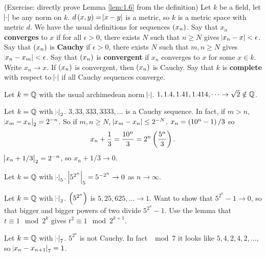 (Exercise: directly prove Lemma \ref{lem:1.6} from the definition) Let $ k $ be a field, let $ \abs{\cdot} $ be any norm on $ k $. $ d\br{x, y} = \abs{x - y} $ is a metric, so $ k $ is a metric space with metric $ d $. We have the usual definitions for sequences $ \br{x_n} $. Say that $ x_n $ \textbf{converges} to $ x $ if for all $ \epsilon > 0 $, there exists $ N $ such that $ n \ge N $ gives $ \abs{x_n - x} < \epsilon $. Say that $ \br{x_n} $ is \textbf{Cauchy} if $ \epsilon > 0 $, there exists $ N $ such that $ m, n \ge N $ gives $ \abs{x_n - x_m} < \epsilon $. Say that $ \br{x_n} $ is \textbf{convergent} if $ x_n $ converges to $ x $ for some $ x \in k $. Write $ x_n \to x $. If $ \br{x_n} $ is convergent, then $ \br{x_n} $ is Cauchy. Say that $ k $ is \textbf{complete} with respect to $ \abs{\cdot} $ if all Cauchy sequences converge.

\pagebreak

\begin{example*}
Let $ k = \mathbb{Q} $ with the usual archimedean norm $ \abs{\cdot} $. $ 1, 1.4, 1.41, 1.414, \dots \to \sqrt{2} \notin \mathbb{Q} $.
\end{example*}

\begin{example*}
Let $ k = \mathbb{Q} $ with $ \abs{\cdot}_2 $. $ 3, 33, 333, 3333, \dots $ is a Cauchy sequence. In fact, if $ m > n $, $ \abs{x_m - x_n}_2 = 2^{-n} $. So if $ m, n \ge N $, $ \abs{x_m - x_n} \le 2^{-N} $. $ x_n = \br{10^n - 1} / 3 $ so
$$ x_n + \dfrac{1}{3} = \dfrac{10^n}{3} = 2^n\br{\dfrac{5^n}{3}}. $$
$ \abs{x_n + 1 / 3}_2 = 2^{-n} $, so $ x_n + 1 / 3 \to 0 $.
\end{example*}

\begin{example*}
Let $ k = \mathbb{Q} $ with $ \abs{\cdot}_5 $. $ \abs{5^{2^n}}_5 = 5^{-2^n} \to 0 $ as $ n \to \infty $.
\end{example*}

\begin{example*}
Let $ k = \mathbb{Q} $ with $ \abs{\cdot}_2 $. $ \br{5^{2^n}} $ is $ 5, 25, 625, \dots \to 1 $. Want to show that $ 5^{2^n} - 1 \to 0 $, so that bigger and bigger powers of two divide $ 5^{2^n} - 1 $. Use the lemma that $ t \equiv 1 \mod 2^k $ gives $ t^2 \equiv 1 \mod 2^{k + 1} $.
\end{example*}

\begin{example*}
Let $ k = \mathbb{Q} $ with $ \abs{\cdot}_7 $. $ 5^{2^n} $ is not Cauchy. In fact $ \mod 7 $ it looks like $ 5, 4, 2, 4, 2, \dots $, so $ \abs{x_n - x_{n + 1}}_7 = 1 $.
\end{example*}

